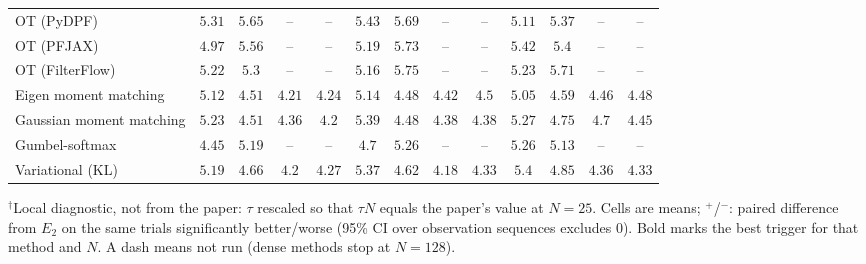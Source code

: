 \begin{table}[ht]
\begin{adjustbox}{max width=\linewidth}
\begin{tabular}{lcccc|cccc|cccc}
OT (PyDPF) & $5.31$ & $5.65$ & -- & -- & $5.43$ & $5.69$ & -- & -- & $\mathbf{5.11}$ & $\mathbf{5.37}$ & -- & -- \\
OT (PFJAX) & $\mathbf{4.97}$ & $5.56$ & -- & -- & $5.19$ & $5.73$ & -- & -- & $5.42$ & $\mathbf{5.4}$ & -- & -- \\
OT (FilterFlow) & $5.22$ & $\mathbf{5.3}$ & -- & -- & $\mathbf{5.16}$ & $5.75$ & -- & -- & $5.23$ & $5.71$ & -- & -- \\
Eigen moment matching & $5.12$ & $4.51$ & $\mathbf{4.21}$ & $\mathbf{4.24}$ & $5.14$ & $\mathbf{4.48}$ & $4.42$ & $4.5$ & $\mathbf{5.05}$ & $4.59$ & $4.46$ & $4.48$ \\
Gaussian moment matching & $\mathbf{5.23}$ & $4.51$ & $\mathbf{4.36}$ & $\mathbf{4.2}$ & $5.39$ & $\mathbf{4.48}$ & $4.38$ & $4.38$ & $5.27$ & $4.75$ & $4.7$ & $4.45$ \\
Gumbel-softmax & $\mathbf{4.45}$ & $5.19$ & -- & -- & $4.7$ & $5.26$ & -- & -- & $5.26$ & $\mathbf{5.13}$ & -- & -- \\
Variational (KL) & $\mathbf{5.19}$ & $4.66$ & $4.2$ & $\mathbf{4.27}$ & $5.37$ & $\mathbf{4.62}$ & $\mathbf{4.18}$ & $4.33$ & $5.4$ & $4.85$ & $4.36$ & $4.33$ \\
\bottomrule
\end{tabular}
\end{adjustbox}
\par\smallskip\parbox{0.95\linewidth}{\footnotesize $^\dagger$Local diagnostic, not from the paper: $\tau$ rescaled so that $\tau N$ equals the paper's value at $N{=}25$. Cells are means; $^{+}$/$^{-}$: paired difference from $E_2$ on the same trials significantly better/worse (95\% CI over observation sequences excludes 0). Bold marks the best trigger for that method and $N$. A dash means not run (dense methods stop at $N{=}128$).}
\end{table}

